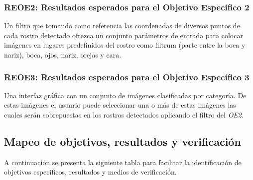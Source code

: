 \documentclass[a4paper,openright,12pt]{report}
\begin{document}
\subsubsection{REOE2: Resultados esperados para el Objetivo Específico 2}
Un filtro que tomando como referencia las coordenadas de diversos puntos de cada
rostro detectado ofrezca un conjunto parámetros de entrada para colocar imágenes
en lugares predefinidos del rostro como filtrum (parte entre la boca y nariz),
boca, ojos, nariz, orejas y cara.
\subsubsection{REOE3: Resultados esperados para el Objetivo Específico 3}
Una interfaz gráfica con un conjunto de imágenes clasificadas por categoría. De
estas imágenes el usuario puede seleccionar una o más de estas imágenes las
cuales serán sobrepuestas en los rostros detectados aplicando el filtro del
\textit{OE2}.

\subsection{Mapeo de objetivos, resultados y verificación}

A continuación se presenta la siguiente tabla para facilitar la identificación
de objetivos específicos, resultados y medios de verificación.
\end{document}
